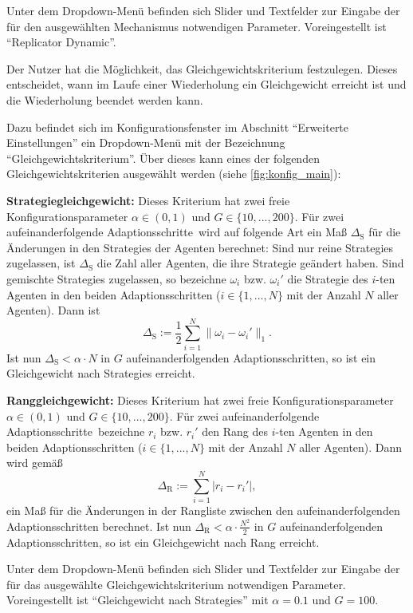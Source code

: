 \documentclass[parskip=full,11pt]{scrartcl}
\def\adapts{Adaptionsschritte}
\begin{document}
Unter dem Dropdown-Menü befinden sich Slider und Textfelder zur Eingabe der für den ausgewählten Mechanismus notwendigen Parameter. Voreingestellt ist \enquote{Replicator Dynamic}.

Der \Gls{Nutzer} hat die Möglichkeit, das Gleichgewichtskriterium festzulegen. Dieses entscheidet, wann im Laufe einer Wiederholung ein Gleichgewicht erreicht ist und die Wiederholung beendet werden kann.

Dazu befindet sich im Konfigurationsfenster im Abschnitt \enquote{Erweiterte Einstellungen} ein Dropdown-Menü mit der Bezeichnung \enquote{Gleichgewichtskriterium}. Über dieses kann eines der folgenden Gleichgewichtskriterien ausgewählt werden (siehe \cref{fig:konfig_main}):

\textbf{Strategiegleichgewicht:}
Dieses Kriterium hat zwei freie Konfigurationsparameter \(\alpha \in (0,1)\) und \(G \in \{10,...,200\}\). Für zwei aufeinanderfolgende \adapts\ wird auf folgende Art ein Maß \(\Delta_\text{S}\) für die Änderungen in den \Glspl{Strategie} der Agenten berechnet: Sind nur reine \Glspl{Strategie} zugelassen, ist \(\Delta_\text{S}\)  die Zahl aller Agenten, die ihre \Gls{Strategie} geändert haben. Sind \glspl{gemischte Strategie} zugelassen, so bezeichne \(\omega_i\) bzw. \(\omega_i'\) die \Gls{Strategie} des \(i\)-ten Agenten in den beiden \adapts n (\(i \in \{1,...,N\}\) mit der Anzahl \(N\) aller Agenten). Dann ist
\[
\Delta_\text{S} :=\frac 12 \sum_{i=1}^N \|\omega_i - \omega_i'\|_1.
\]
Ist nun \(\Delta_\text{S} < \alpha \cdot N\) in \(G\) aufeinanderfolgenden \adapts n, so ist ein Gleichgewicht nach \Glspl{Strategie} erreicht.

\textbf{Ranggleichgewicht:}
Dieses Kriterium hat zwei freie Konfigurationsparameter \(\alpha \in (0,1)\) und \(G \in \{10,...,200\}\). Für zwei aufeinanderfolgende \adapts\ bezeichne \(r_i\) bzw. \(r_i'\) den Rang des \(i\)-ten Agenten in den beiden \adapts n (\(i \in \{1,...,N\}\) mit der Anzahl \(N\) aller Agenten). Dann wird gemäß
\[
\Delta_\text{R} := \sum_{i=1}^N |r_i - r_i'|,
\]
ein Maß für die Änderungen in der Rangliste zwischen den aufeinanderfolgenden \adapts n berechnet. Ist nun \(\Delta_\text{R} < \alpha \cdot \frac{N^2}{2}\) in \(G\) aufeinanderfolgenden \adapts n, so ist ein Gleichgewicht nach Rang erreicht.

Unter dem Dropdown-Menü befinden sich Slider und Textfelder zur Eingabe der für das ausgewählte Gleichgewichtskriterium notwendigen Parameter. Voreingestellt ist \enquote{Gleichgewicht nach \Glspl{Strategie}} mit \(\alpha = 0.1\) und \(G = 100\).
\end{document}
